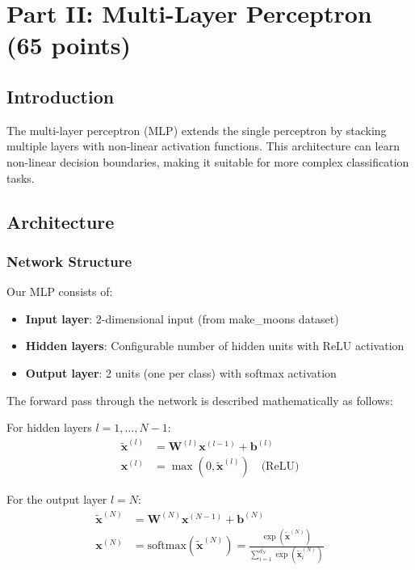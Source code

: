 \documentclass[11pt,a4paper]{article}
\begin{document}
\newpage
\section{Part II: Multi-Layer Perceptron (65 points)}

\subsection{Introduction}
The multi-layer perceptron (MLP) extends the single perceptron by stacking multiple layers with non-linear activation functions. This architecture can learn non-linear decision boundaries, making it suitable for more complex classification tasks.

\subsection{Architecture}

\subsubsection{Network Structure}
Our MLP consists of:
\begin{itemize}
    \item \textbf{Input layer}: 2-dimensional input (from make\_moons dataset)
    \item \textbf{Hidden layers}: Configurable number of hidden units with ReLU activation
    \item \textbf{Output layer}: 2 units (one per class) with softmax activation
\end{itemize}

The forward pass through the network is described mathematically as follows:

For hidden layers $l = 1, \ldots, N-1$:
\begin{align}
\tilde{\mathbf{x}}^{(l)} &= \mathbf{W}^{(l)} \mathbf{x}^{(l-1)} + \mathbf{b}^{(l)} \\
\mathbf{x}^{(l)} &= \max(0, \tilde{\mathbf{x}}^{(l)}) \quad \text{(ReLU)}
\end{align}

For the output layer $l = N$:
\begin{align}
\tilde{\mathbf{x}}^{(N)} &= \mathbf{W}^{(N)} \mathbf{x}^{(N-1)} + \mathbf{b}^{(N)} \\
\mathbf{x}^{(N)} &= \text{softmax}(\tilde{\mathbf{x}}^{(N)}) = \frac{\exp(\tilde{\mathbf{x}}^{(N)})}{\sum_{i=1}^{d_N} \exp(\tilde{\mathbf{x}}^{(N)}_i)}
\end{align}
\end{document}

